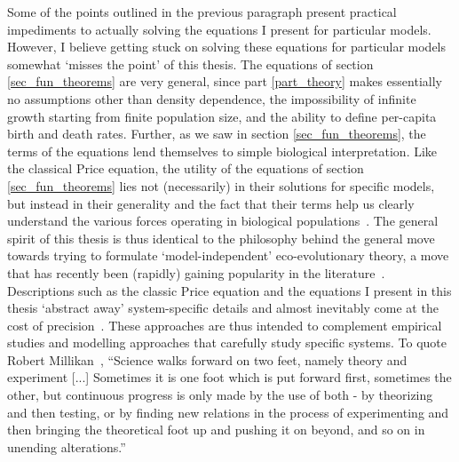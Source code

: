 Some of the points outlined in the previous paragraph present practical impediments to actually solving the equations I present for particular models. However, I believe getting stuck on solving these equations for particular models somewhat `misses the point' of this thesis. The equations of section \ref{sec_fun_theorems} are very general, since part \ref{part_theory} makes essentially no assumptions other than density dependence, the impossibility of infinite growth starting from finite population size, and the ability to define per-capita birth and death rates. Further, as we saw in section \ref{sec_fun_theorems}, the terms of the equations lend themselves to simple biological interpretation. Like the classical Price equation, the utility of the equations of section \ref{sec_fun_theorems} lies not (necessarily) in their solutions for specific models, but instead in their generality and the fact that their terms help us clearly understand the various forces operating in biological populations~\citep{frank_natural_2012,luque_one_2017, luque_mirror_2021}. The general spirit of this thesis is thus identical to the philosophy behind the general move towards trying to formulate `model-independent' eco-evolutionary theory, a move that has recently been (rapidly) gaining popularity in the literature~\citep{grafen_formal_2014, queller_fundamental_2017, lion_theoretical_2018, allen_mathematical_2019, rice_universal_2020, week_white_2021, wickman_theoretical_2022, kuosmanen_turnover_2022, mazzolini_universality_2022,lion_extending_2023,allen_natural_2023}. Descriptions such as the classic Price equation and the equations I present in this thesis `abstract away' system-specific details and almost inevitably come at the cost of precision~\citep{levins_strategy_1966, potochnik_idealization_2018}. These approaches are thus intended to complement empirical studies and modelling approaches that carefully study specific systems. To quote Robert Millikan~\citep{millikan_electron_1924}, ``Science walks forward on two feet, namely theory and experiment [...] Sometimes it is one foot which is put forward first, sometimes the other, but continuous progress is only made by the use of both - by theorizing and then testing, or by finding new relations in the process of experimenting and then bringing the theoretical foot up and pushing it on beyond, and so on in unending alterations.''